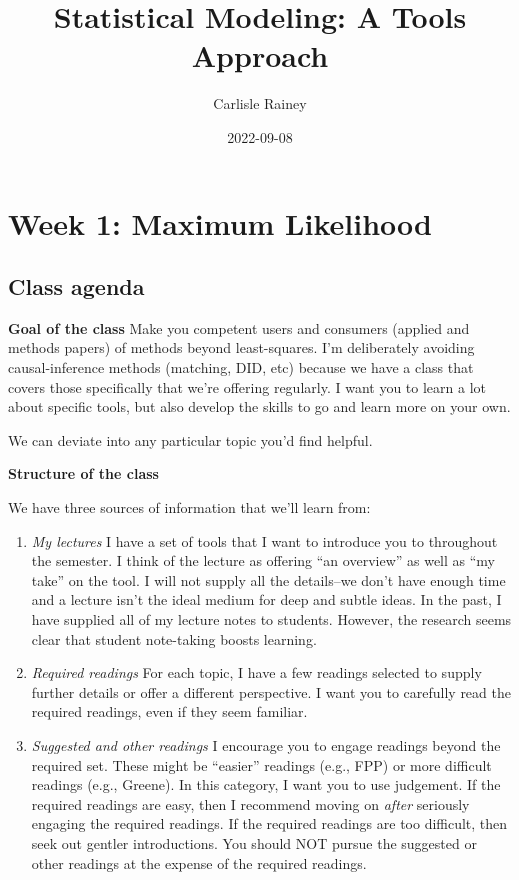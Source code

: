 \documentclass[
]{book}
\title{Statistical Modeling: A Tools Approach}
\author{Carlisle Rainey}
\date{2022-09-08}
\providecommand{\tightlist}{%
  \setlength{\itemsep}{0pt}\setlength{\parskip}{0pt}}
\begin{document}
\frontmatter
\maketitle

\mainmatter
\hypertarget{week-1-maximum-likelihood}{%
\chapter{Week 1: Maximum Likelihood}\label{week-1-maximum-likelihood}}

\hypertarget{class-agenda}{%
\section{Class agenda}\label{class-agenda}}

\textbf{Goal of the class} Make you competent users and consumers
(applied and methods papers) of methods beyond least-squares. I'm
deliberately avoiding causal-inference methods (matching, DID, etc)
because we have a class that covers those specifically that we're
offering regularly. I want you to learn a lot about specific tools, but
also develop the skills to go and learn more on your own.

We can deviate into any particular topic you'd find helpful.

\textbf{Structure of the class}

We have three sources of information that we'll learn from:

\begin{enumerate}
\def\labelenumi{\arabic{enumi}.}
\tightlist
\item
  \emph{My lectures} I have a set of tools that I want to introduce you
  to throughout the semester. I think of the lecture as offering ``an
  overview'' as well as ``my take'' on the tool. I will not supply all
  the details--we don't have enough time and a lecture isn't the ideal
  medium for deep and subtle ideas. In the past, I have supplied all of
  my lecture notes to students. However, the research seems clear that
  student note-taking boosts learning.
\item
  \emph{Required readings} For each topic, I have a few readings
  selected to supply further details or offer a different perspective. I
  want you to carefully read the required readings, even if they seem
  familiar.
\item
  \emph{Suggested and other readings} I encourage you to engage readings
  beyond the required set. These might be ``easier'' readings (e.g.,
  FPP) or more difficult readings (e.g., Greene). In this category, I
  want you to use judgement. If the required readings are easy, then I
  recommend moving on \emph{after} seriously engaging the required
  readings. If the required readings are too difficult, then seek out
  gentler introductions. You should NOT pursue the suggested or other
  readings at the expense of the required readings.
\end{enumerate}
\end{document}
